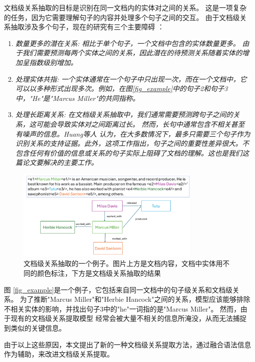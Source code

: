\documentclass[bachelor]{thesis-uestc}
\begin{document}
文档级关系抽取的目标是识别在同一文档内的实体对之间的关系。
这是一项复杂的任务，因为它需要理解句子的内容并处理多个句子之间的交互。
由于文档级关系抽取涉及多个句子，现在的研究有三个主要障碍 \cite{9098945}：
\begin{enumerate}
    \item \em{数量更多的潜在关系}: 相比于单个句子，一个文档中包含的实体数量更多。
    由于我们需要预测每两个实体之间的关系，因此潜在的待预测关系随着实体的增加呈指数级别增加。
    \item \em{处理实体共指}: 一个实体通常在一个句子中只出现一次，而在一个文档中，它可以以多种形式出现多次。例如，在图\ref{fig_example}中的句子2和句子3中，"He"是"Marcus Miller"的共同指称。
    \item \em{处理长距离关系}: 在文档级关系抽取中，我们通常需要预测跨句子之间的关系，这可能会导致实体对之间距离过长。
    然而，长句中通常包含不相关甚至有噪声的信息。Huang等人\cite{huang-etal-2021-three} 认为，在大多数情况下，最多只需要三个句子作为识别关系的支持证据。此外，这项工作指出，句子之间的重要性差异很大。不包含任何有价值的信息或关系的句子实际上阻碍了文档的理解。这也是我们这篇论文要解决的主要工作。
\end{enumerate}
\begin{figure}[h]
    \centering
    \caption{文档级关系抽取的一个例子。图片上方是文档内容，文档中实体用不同的颜色标注，下方是文档级关系抽取的结果}
    \includegraphics[width=0.8\textwidth]{misc/fig_example.pdf}
\end{figure}\label{fig_example}

图 \ref{fig_example}是一个例子，它包括来自同一文档中的句子级关系和文档级关系。
为了推断"Marcus Miller"和"Herbie Hancock"之间的关系，模型应该能够排除不相关实体的影响，并找出句子3中的"he"一词指的是"Marcus Miller"。
然而，由于现有的文档级关系提取模型 \cite{bai-etal-2021-syntax} 经常会被大量不相关的信息所淹没，从而无法捕捉到类似的关键信息。 \par

由于以上这些原因，本文提出了新的一种文档级关系提取方法，通过融合语法信息作为辅助，来改进文档级关系提取。\par
\end{document}
